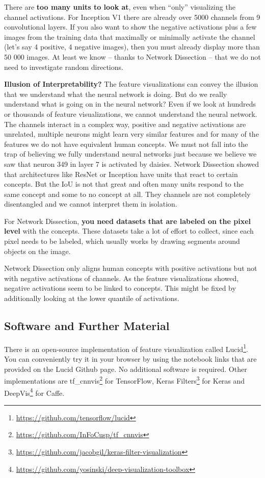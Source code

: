 \documentclass[12pt,]{krantz}
\renewcommand{\href}[2]{#2\footnote{\url{#1}}}
\begin{document}
There are \textbf{too many units to look at}, even when ``only''
visualizing the channel activations. For Inception V1 there are already
over 5000 channels from 9 convolutional layers. If you also want to show
the negative activations plus a few images from the training data that
maximally or minimally activate the channel (let's say 4 positive, 4
negative images), then you must already display more than 50 000 images.
At least we know -- thanks to Network Dissection -- that we do not need
to investigate random directions.

\textbf{Illusion of Interpretability?} The feature visualizations can
convey the illusion that we understand what the neural network is doing.
But do we really understand what is going on in the neural network? Even
if we look at hundreds or thousands of feature visualizations, we cannot
understand the neural network. The channels interact in a complex way,
positive and negative activations are unrelated, multiple neurons might
learn very similar features and for many of the features we do not have
equivalent human concepts. We must not fall into the trap of believing
we fully understand neural networks just because we believe we saw that
neuron 349 in layer 7 is activated by daisies. Network Dissection showed
that architectures like ResNet or Inception have units that react to
certain concepts. But the IoU is not that great and often many units
respond to the same concept and some to no concept at all. They channels
are not completely disentangled and we cannot interpret them in
isolation.

For Network Dissection, \textbf{you need datasets that are labeled on
the pixel level} with the concepts. These datasets take a lot of effort
to collect, since each pixel needs to be labeled, which usually works by
drawing segments around objects on the image.

Network Dissection only aligns human concepts with positive activations
but not with negative activations of channels. As the feature
visualizations showed, negative activations seem to be linked to
concepts. This might be fixed by additionally looking at the lower
quantile of activations.

\subsection{Software and Further
Material}\label{software-and-further-material}

There is an open-source implementation of feature visualization called
\href{https://github.com/tensorflow/lucid}{Lucid}. You can conveniently
try it in your browser by using the notebook links that are provided on
the Lucid Github page. No additional software is required. Other
implementations are
\href{https://github.com/InFoCusp/tf_cnnvis}{tf\_cnnvis} for TensorFlow,
\href{https://github.com/jacobgil/keras-filter-visualization}{Keras
Filters} for Keras and
\href{https://github.com/yosinski/deep-visualization-toolbox}{DeepVis}
for Caffe.
\end{document}
